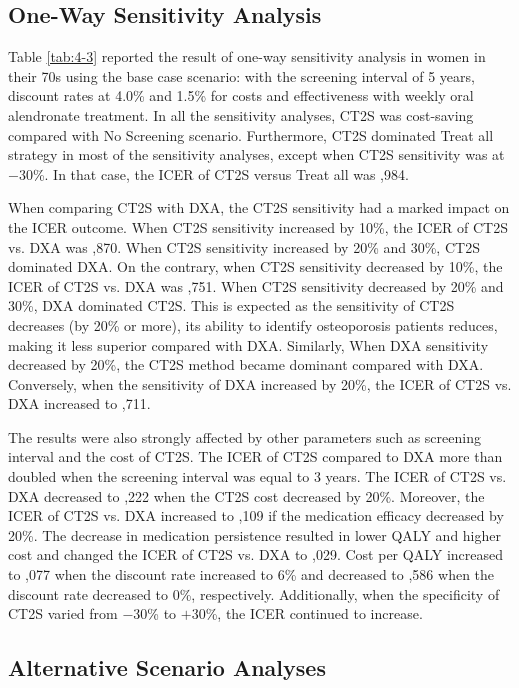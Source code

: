 \subsection{One-Way Sensitivity Analysis}

Table \ref{tab:4-3} reported the result of one-way sensitivity analysis in women in their 70s using the base case scenario: with the screening interval of 5 years, discount rates at 4.0\% and 1.5\% for costs and effectiveness with weekly oral alendronate treatment. In all the sensitivity analyses, CT2S was cost-saving compared with No Screening scenario. Furthermore, CT2S dominated Treat all strategy in most of the sensitivity analyses, except when CT2S sensitivity was at $-$30\%. In that case, the ICER of CT2S versus Treat all was ,984.  

When comparing CT2S with DXA, the CT2S sensitivity had a marked impact on the ICER outcome. When CT2S sensitivity increased by 10\%, the ICER of CT2S vs. DXA was ,870. When CT2S sensitivity increased by 20\% and 30\%, CT2S dominated DXA. On the contrary, when CT2S sensitivity decreased by 10\%, the ICER of CT2S vs. DXA was ,751. When CT2S sensitivity decreased by 20\% and 30\%, DXA dominated CT2S. This is expected as the sensitivity of CT2S decreases (by 20\% or more), its ability to identify osteoporosis patients reduces, making it less superior compared with DXA.  Similarly, When DXA sensitivity decreased by 20\%, the CT2S method became dominant compared with DXA. Conversely, when the sensitivity of DXA increased by 20\%, the ICER of CT2S vs. DXA increased to ,711.

The results were also strongly affected by other parameters such as screening interval and the cost of CT2S. The ICER of CT2S compared to DXA more than doubled when the screening interval was equal to 3 years. The ICER of CT2S vs. DXA decreased to ,222 when the CT2S cost decreased by 20\%. Moreover, the ICER of CT2S vs. DXA increased to ,109 if the medication efficacy decreased by 20\%. The decrease in medication persistence resulted in lower QALY and higher cost and changed the ICER of CT2S vs. DXA to ,029. Cost per QALY increased to ,077 when the discount rate increased to 6\% and decreased to ,586 when the discount rate decreased to 0\%, respectively. Additionally, when the specificity of CT2S varied from $-$30\% to $+$30\%, the ICER continued to increase. 

\subsection{Alternative Scenario Analyses}


